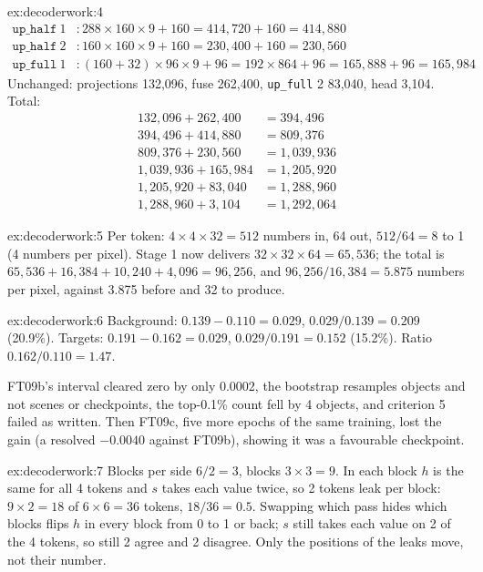 \begin{solution}{ex:decoderwork:4}
\begin{align*}
\texttt{up\_half}\ 1 &: 288\times160\times9+160 = 414{,}720+160 = 414{,}880\\
\texttt{up\_half}\ 2 &: 160\times160\times9+160 = 230{,}400+160 = 230{,}560\\
\texttt{up\_full}\ 1 &: (160+32)\times96\times9+96 = 192\times864+96 = 165{,}888+96 = 165{,}984
\end{align*}
Unchanged: projections 132,096, fuse 262,400, \texttt{up\_full} 2 83,040, head 3,104. Total:
\begin{align*}
132{,}096+262{,}400 &= 394{,}496\\
394{,}496+414{,}880 &= 809{,}376\\
809{,}376+230{,}560 &= 1{,}039{,}936\\
1{,}039{,}936+165{,}984 &= 1{,}205{,}920\\
1{,}205{,}920+83{,}040 &= 1{,}288{,}960\\
1{,}288{,}960+3{,}104 &= 1{,}292{,}064
\end{align*}
\end{solution}

\begin{solution}{ex:decoderwork:5}
Per token: $4\times4\times32=512$ numbers in, 64 out, $512/64=8$ to 1 (4 numbers per pixel). Stage 1 now delivers
$32\times32\times64=65{,}536$; the total is $65{,}536+16{,}384+10{,}240+4{,}096=96{,}256$, and
$96{,}256/16{,}384=5.875$ numbers per pixel, against 3.875 before and 32 to produce.
\end{solution}

\begin{solution}{ex:decoderwork:6}
Background: $0.139-0.110=0.029$, $0.029/0.139=0.209$ (20.9\%). Targets: $0.191-0.162=0.029$,
$0.029/0.191=0.152$ (15.2\%). Ratio $0.162/0.110=1.47$.

FT09b's interval cleared zero by only $0.0002$, the bootstrap resamples objects and not scenes or checkpoints, the
top-0.1\% count fell by 4 objects, and criterion 5 failed as written. Then FT09c, five more epochs of the same
training, lost the gain (a resolved $-0.0040$ against FT09b), showing it was a favourable checkpoint.
\end{solution}

\begin{solution}{ex:decoderwork:7}
Blocks per side $6/2=3$, blocks $3\times3=9$. In each block $h$ is the same for all 4 tokens and $s$ takes each
value twice, so 2 tokens leak per block: $9\times2=18$ of $6\times6=36$ tokens, $18/36=0.5$. Swapping which pass
hides which blocks flips $h$ in every block from 0 to 1 or back; $s$ still takes each value on 2 of the 4 tokens,
so still 2 agree and 2 disagree. Only the positions of the leaks move, not their number.
\end{solution}

